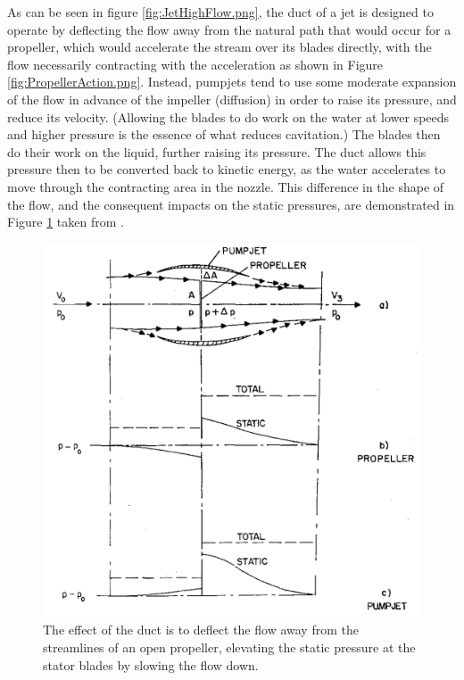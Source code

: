 \documentclass{article}\usepackage[]{graphicx}\usepackage[]{color}
\begin{document}
As can be seen in figure \ref{fig:JetHighFlow.png}, the duct of a jet is designed to operate by deflecting the flow away from the natural path that would occur for a propeller, which would accelerate the stream over its blades directly, with the flow necessarily contracting with the acceleration as shown in Figure \ref{fig:PropellerAction.png}.   Instead, pumpjets tend to use some moderate expansion of the flow in advance of the impeller (diffusion) in order to raise its pressure, and reduce its velocity.  (Allowing the blades to do work on the water at lower speeds and higher pressure is the essence of what reduces cavitation.)  The blades then do their work on the liquid, further raising its pressure.  The duct allows this pressure then to be converted back to kinetic energy, as the water accelerates to move through the contracting area in the nozzle.  This difference in the shape of the flow, and the consequent impacts on the static pressures, are demonstrated in Figure \ref{fig:FlowComparison.png} taken from \cite{mccormick1963design}.

\begin{figure}
\includegraphics[width=\textwidth]{FlowComparison.png}
\caption{The effect of the duct is to deflect the flow away from the streamlines of an open propeller, elevating the static pressure at the stator blades by slowing the flow down.}
\label{fig:FlowComparison.png}
\end{figure}
\end{document}
